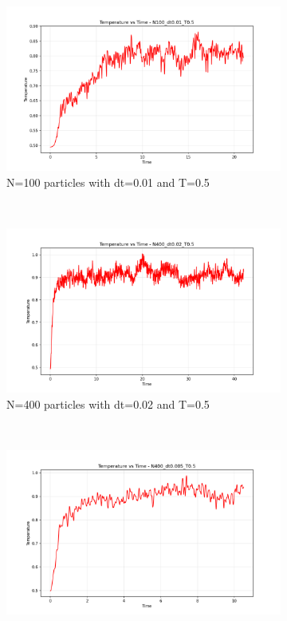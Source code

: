 \begin{figure}[H]
	\centering
	\begin{subfigure}{0.5\textwidth}
		\includegraphics[width=\textwidth]{media/temp_N100_dt0.01_T0.5.png}
		\caption{N=100 particles with dt=0.01 and T=0.5}
		\label{sfig:temp_N100}
	\end{subfigure}%
	~
	\begin{subfigure}{0.5\textwidth}
		\includegraphics[width=\textwidth]{media/temp_N400_dt0.02_T0.5.png}
		\caption{N=400 particles with dt=0.02 and T=0.5}
		\label{sfig:temp_N400_dt002}
	\end{subfigure}%
	\\
	\begin{subfigure}{0.5\textwidth}
		\includegraphics[width=\textwidth]{media/temp_N400_dt0.005_T0.5.png}

\end{subfigure}
\end{figure}
